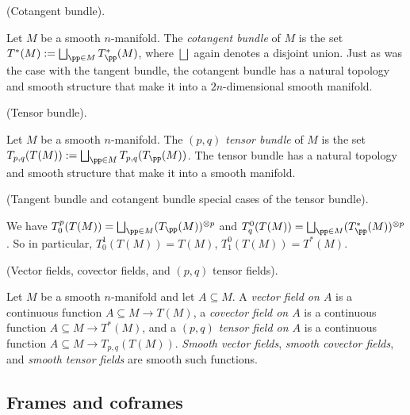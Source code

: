 \begin{defn}
     (Cotangent bundle).
    
    Let $M$ be a smooth $n$-manifold. The \textit{cotangent bundle} of $M$ is the set $T^*(M) := \bigsqcup_{\pp \in M} T_\pp^*(M)$, where $\bigsqcup$ again denotes a disjoint union. Just as was the case with the tangent bundle, the cotangent bundle has a natural topology and smooth structure that make it into a $2n$-dimensional smooth manifold.
\end{defn}

\begin{defn}
     (Tensor bundle).
    
    Let $M$ be a smooth $n$-manifold. The \textit{$(p, q)$ tensor bundle} of $M$ is the set $T_{p, q}(T(M)) := \bigsqcup_{\pp \in M} T_{p, q}(T_\pp(M))$. The tensor bundle has a natural topology and smooth structure that make it into a smooth manifold.
\end{defn}

\begin{remark}
     (Tangent bundle and cotangent bundle special cases of the tensor bundle).
    
    We have $T^p_0(T(M)) = \bigsqcup_{\pp \in M} (T_\pp(M))^{\otimes p}$ and $T^0_q(T(M)) = \bigsqcup_{\pp \in M} (T_\pp^*(M))^{\otimes p}$. So in particular, $T^1_0(T(M)) = T(M)$, $T^0_1(T(M)) = T^*(M)$.
    
\end{remark}

\begin{defn}
     (Vector fields, covector fields, and $(p, q)$ tensor fields).
    
    Let $M$ be a smooth $n$-manifold and let $A \subseteq M$. A \textit{vector field on $A$} is a continuous function $A \subseteq M \rightarrow T(M)$, a \textit{covector field on $A$} is a continuous function $A \subseteq M \rightarrow T^*(M)$, and a \textit{$(p, q)$ tensor field on $A$} is a continuous function $A \subseteq M \rightarrow T_{p, q}(T(M))$. \textit{Smooth vector fields}, \textit{smooth covector fields}, and \textit{smooth tensor fields} are smooth such functions.
\end{defn}

\subsection*{Frames and coframes}


